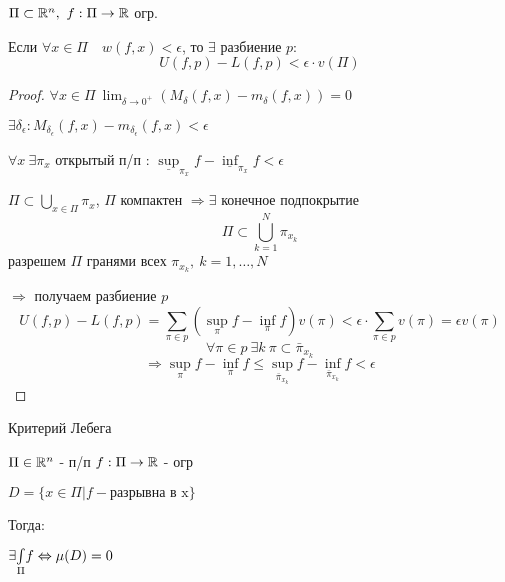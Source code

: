     \begin{lemma}
        $\Pi \subset \mathbb{R}^n, \ f : \Pi \rightarrow \mathbb{R}$ огр.
        \par Если $\forall x \in \Pi \quad w(f, x) < \epsilon$, то  $\exists$ разбиение $p$:
        \[
            U(f, p) - L(f, p) < \epsilon \cdot v(\Pi)    
        \]
    \end{lemma}
    \begin{proof}
        $\forall x \in \Pi \ \lim_{\delta \rightarrow 0^+}(M_\delta(f, x) - m_\delta(f, x)) = 0 $
        \par $\exists \delta_\epsilon : M_{\delta_\epsilon}(f, x) - m_{\delta_\epsilon}(f, x) < \epsilon$
        \par $\forall x \ \exists \pi_x$ открытый п/п : $\underline{\sup}_{\pi_x} f - \underline{\inf}_{\pi_x} f < \epsilon$
        \par $\Pi \subset \bigcup_{x \in \Pi} \pi_x$, $\Pi$ компактен $\Rightarrow \exists$ конечное подпокрытие
        \[
            \Pi \subset \bigcup_{k=1}^N \pi_{x_k}    
        \]
        разрешем $\Pi$ гранями всех $\pi_{x_k}, \ k = 1, \dots, N$
        \par $\Rightarrow$ получаем разбиение $p$
        \[
            U(f, p) - L(f, p) = \sum_{\pi \in p} (\sup_\pi f - \inf_\pi f) v(\pi) < \epsilon \cdot \sum_{\pi \in p} v(\pi) = \epsilon v(\pi)    
        \]
        \[
            \forall \pi \in p \ \exists k \ \pi \subset \bar \pi_{x_k}    
        \]
        \[
            \Rightarrow \sup_\pi f - \inf_\pi f \le \sup_{\bar \pi_{x_k}} f - \inf_{\bar \pi_{x_k}} f < \epsilon
        \]
    \end{proof}

    \begin{theorem}
        Критерий Лебега    

        \par $\Pi \in \mathbb{R}^n$ - п/п $f: \Pi \rightarrow \mathbb{R}$ - огр 
        \par $D = \{x \in \Pi | f - \text{разрывна в x}\}$
        \par Тогда:
        \par $\exists \underset{\Pi}{\int} f \Leftrightarrow \mu(D)=0$
    \end{theorem}


